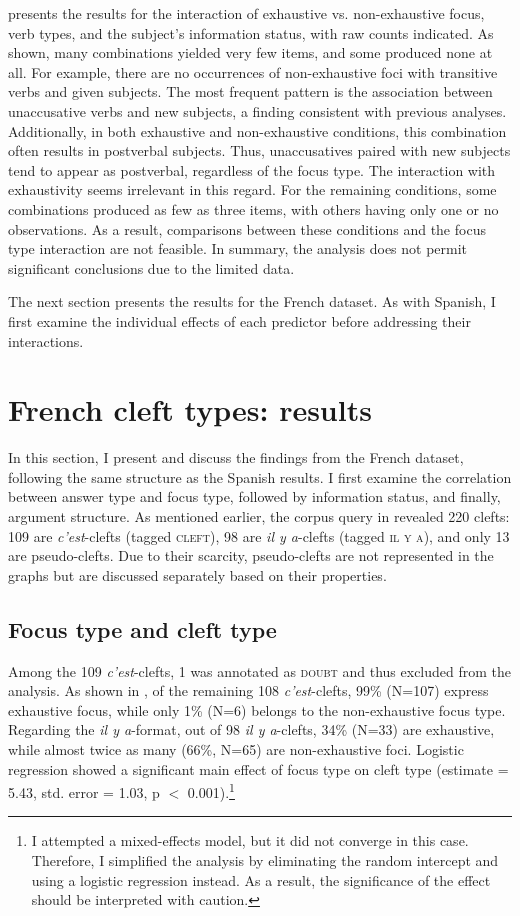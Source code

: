  presents the results for the interaction of exhaustive vs. non-exhaus\-tive focus, verb types, and the subject's information status, with raw counts indicated. As shown, many combinations yielded very few items, and some produced none at all. For example, there are no occurrences of non-exhaustive foci with transitive verbs and given subjects.
The most frequent pattern is the association between unaccusative verbs and new subjects, a finding consistent with previous analyses. Additionally, in both exhaustive and non-exhaustive conditions, this combination often results in postverbal subjects. Thus, unaccusatives paired with new subjects tend to appear as postverbal, regardless of the focus type. The interaction with exhaustivity seems irrelevant in this regard.
For the remaining conditions, some combinations produced as few as three items, with others having only one or no observations. As a result, comparisons between these conditions and the focus type interaction are not feasible.
In summary, the analysis does not permit significant conclusions due to the limited data.

The next section presents the results for the French dataset. As with Spanish, I first examine the individual effects of each predictor before addressing their interactions.


\section{French cleft types: results} \label{sub:6.8}
In this section, I present and discuss the findings from the French dataset, following the same structure as the Spanish results. I first examine the correlation between answer type and focus type, followed by information status, and finally, argument structure. As mentioned earlier, the corpus query in  revealed 220 clefts: 109 are \textit{c’est}-clefts (tagged \textsc{cleft}), 98 are \textit{il y a}-clefts (tagged \textsc{il y a}), and only 13 are pseudo-clefts. Due to their scarcity, pseudo-clefts are not represented in the graphs but are discussed separately based on their properties.


\subsection{Focus type and cleft type} \label{sub:6.8.1}
Among the 109 \textit{c'est}-clefts, 1 was annotated as \textsc{doubt} and thus excluded from the analysis. As shown in , of the remaining 108 \textit{c'est}-clefts, 99\% (N=107) express exhaustive focus, while only 1\% (N=6) belongs to the non-exhaustive focus type. Regarding the \textit{il y a}-format, out of 98 \textit{il y a}-clefts, 34\% (N=33) are exhaustive, while almost twice as many (66\%, N=65) are non-exhaustive foci. Logistic regression showed a significant main effect of focus type on cleft type (estimate = 5.43, std. error = 1.03, p $<$ 0.001).\footnote{I attempted a mixed-effects model, but it did not converge in this case. Therefore, I simplified the analysis by eliminating the random intercept and using a logistic regression instead. As a result, the significance of the effect should be interpreted with caution.}

